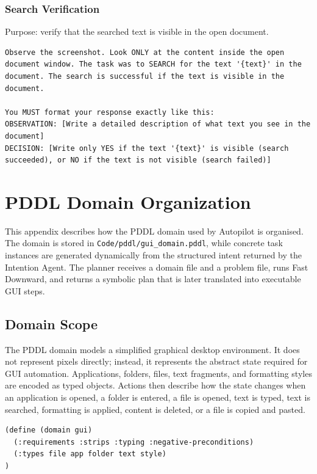 \subsection{Search Verification}

Purpose: verify that the searched text is visible in the open document.

\begin{lstlisting}
Observe the screenshot. Look ONLY at the content inside the open document window. The task was to SEARCH for the text '{text}' in the document. The search is successful if the text is visible in the document.

You MUST format your response exactly like this:
OBSERVATION: [Write a detailed description of what text you see in the document]
DECISION: [Write only YES if the text '{text}' is visible (search succeeded), or NO if the text is not visible (search failed)]
\end{lstlisting}

\chapter{PDDL Domain Organization}
\label{app:pddl_domain}

This appendix describes how the PDDL domain used by Autopilot is organised. The domain is stored in \texttt{Code/pddl/gui\_domain.pddl}, while concrete task instances are generated dynamically from the structured intent returned by the Intention Agent. The planner receives a domain file and a problem file, runs Fast Downward, and returns a symbolic plan that is later translated into executable GUI steps.

\section{Domain Scope}

The PDDL domain models a simplified graphical desktop environment. It does not represent pixels directly; instead, it represents the abstract state required for GUI automation. Applications, folders, files, text fragments, and formatting styles are encoded as typed objects. Actions then describe how the state changes when an application is opened, a folder is entered, a file is opened, text is typed, text is searched, formatting is applied, content is deleted, or a file is copied and pasted.

\begin{lstlisting}
(define (domain gui)
  (:requirements :strips :typing :negative-preconditions)
  (:types file app folder text style)
)
\end{lstlisting}

